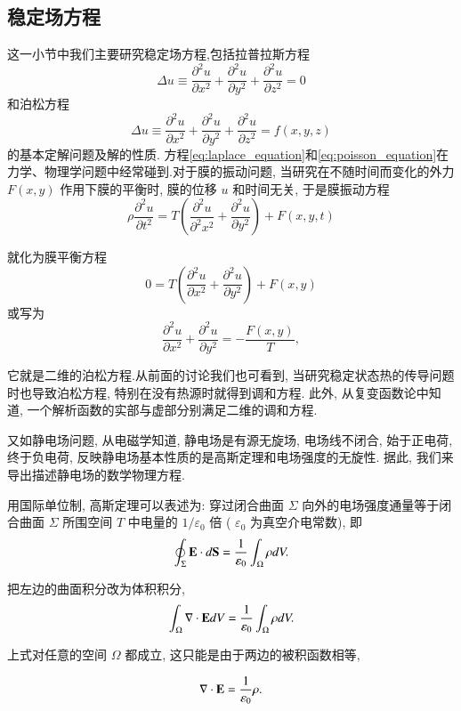 \subsection{稳定场方程}
这一小节中我们主要研究稳定场方程,包括拉普拉斯方程
\begin{equation}
    \Delta u \equiv \frac{\partial^2 u}{\partial x^2}+\frac{\partial^2 u}{\partial y^2}+\frac{\partial^2 u}{\partial z^2}=0
    \label{eq:laplace_equation}
\end{equation}
和泊松方程
\begin{equation}
    \Delta u \equiv \frac{\partial^2 u}{\partial x^2}+\frac{\partial^2 u}{\partial y^2}+\frac{\partial^2 u}{\partial z^2}=f(x, y, z)
    \label{eq:poisson_equation}
\end{equation}
的基本定解问题及解的性质.
方程\eqref{eq:laplace_equation}和\eqref{eq:poisson_equation}在力学、物理学问题中经常碰到.对于膜的振动问题, 
当研究在不随时间而变化的外力 $F(x, y)$ 
作用下膜的平衡时, 膜的位移 $u$ 和时间无关, 于是膜振动方程
$$
\rho \frac{\partial^2 u}{\partial t^2}=T\left(\frac{\partial^2 u}{\partial^2 x^2}
+\frac{\partial^2 u}{\partial y^2}\right)+F(x, y, t)
$$

就化为膜平衡方程
$$
0=T\left(\frac{\partial^2 u}{\partial x^2}+\frac{\partial^2 u}{\partial y^2}\right)+F(x, y)
$$
或写为
$$
\frac{\partial^2 u}{\partial x^2}+\frac{\partial^2 u}{\partial y^2}=-\frac{F(x, y)}{T},
$$

它就是二维的泊松方程.从前面的讨论我们也可看到, 
当研究稳定状态热的传导问题时也导致泊松方程, 特别在没有热源时就得到调和方程. 
此外, 从复变函数论中知道, 一个解析函数的实部与虚部分别满足二维的调和方程.

又如静电场问题, 从电磁学知道, 静电场是有源无旋场, 电场线不闭合, 始于正电荷, 
终于负电荷, 反映静电场基本性质的是高斯定理和电场强度的无旋性. 据此, 我们来导出描述静电场的数学物理方程.

用国际单位制, 高斯定理可以表述为: 穿过闭合曲面 $\Sigma$ 向外的电场强度通量等于闭合曲面 $\Sigma$ 
所围空间 $T$ 中电量的 $1 / \varepsilon_0$ 倍 ( $\varepsilon_0$ 为真空介电常数), 即
$$
\oint_{\Sigma} {\mathbf{E}} \cdot d {\mathbf{S}}=\frac{1}{\varepsilon_0} \int_{\Omega} \rho d V .
$$

把左边的曲面积分改为体积积分,
$$
\int_{\Omega} \nabla \cdot {\mathbf{E}} d V=\frac{1}{\varepsilon_0} \int_{\Omega} \rho d V .
$$

上式对任意的空间 $\Omega$ 都成立, 这只能是由于两边的被积函数相等,

\begin{equation}
    \nabla \cdot {\mathbf{E}}=\frac{1}{\varepsilon_0} \rho .
    \label{eq:nabla_dot_E}
\end{equation}

